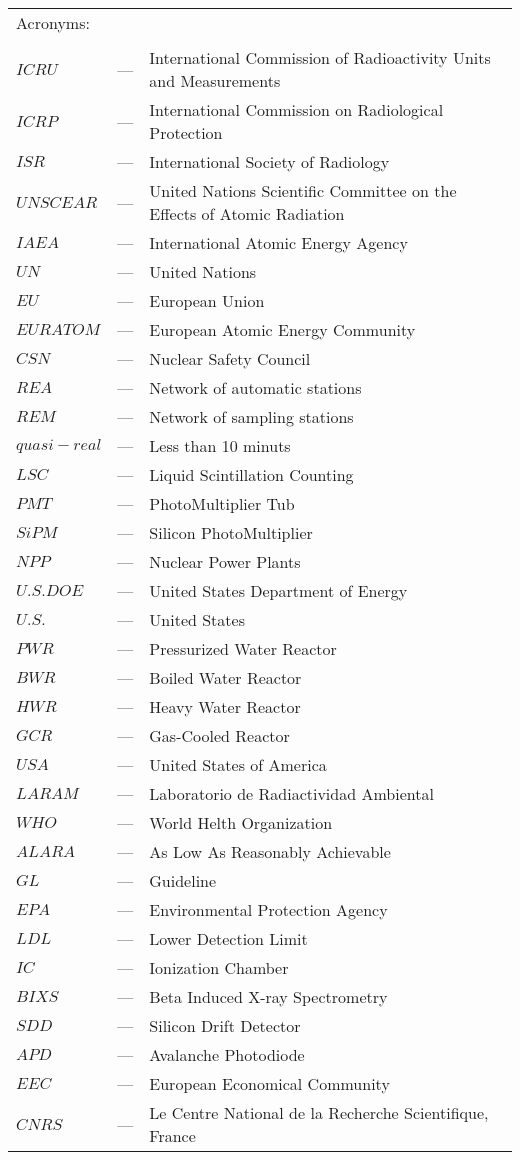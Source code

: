 \begin{longtable}{p{25mm} c p{120mm} }
\multicolumn{3}{l}{Acronyms:}\\
\\
$ICRU$ & --- & International Commission of Radioactivity Units and Measurements\\
$ICRP$ & --- & International Commission on Radiological Protection \\
$ISR$ & --- & International Society of Radiology \\
$UNSCEAR$ & --- & United Nations Scientific Committee on the Effects of Atomic Radiation\\
$IAEA$ & --- & International Atomic Energy Agency \\
$UN$ & --- & United Nations\\
$EU$ & --- & European Union\\
$EURATOM$ & --- & European Atomic Energy Community\\
$CSN$ & --- & Nuclear Safety Council\\
$REA$ & --- & Network of automatic stations\\
$REM$ & --- & Network of sampling stations\\
$quasi-real$ & --- & Less than 10 minuts\\
$LSC$ & --- & Liquid Scintillation Counting\\
$PMT$ & --- & PhotoMultiplier Tub\\
$SiPM$ & --- & Silicon PhotoMultiplier\\
$NPP$ & --- & Nuclear Power Plants\\
$U.S. DOE$ & --- & United States Department of Energy\\
$U.S.$ & --- & United States\\
$PWR$ & --- & Pressurized Water Reactor\\
$BWR$ & --- & Boiled Water Reactor\\
$HWR$ & --- & Heavy Water Reactor\\
$GCR$ & --- & Gas-Cooled Reactor\\
$USA$ & --- & United States of America\\
$LARAM$ & --- & Laboratorio de Radiactividad Ambiental\\
$WHO$ & --- & World Helth Organization\\
$ALARA$ & --- & As Low As Reasonably Achievable\\
$GL$ & --- & Guideline\\
$EPA$ & --- & Environmental Protection Agency\\
$LDL$ & --- & Lower Detection Limit\\
$IC$ & --- & Ionization Chamber\\
$BIXS$ & --- & Beta Induced X-ray Spectrometry\\
$SDD$ & --- & Silicon Drift Detector\\
$APD$ & --- & Avalanche Photodiode\\
$EEC$ & --- & European Economical Community\\
$CNRS$ & --- & Le Centre National de la Recherche Scientifique, France\\



\end{longtable}
